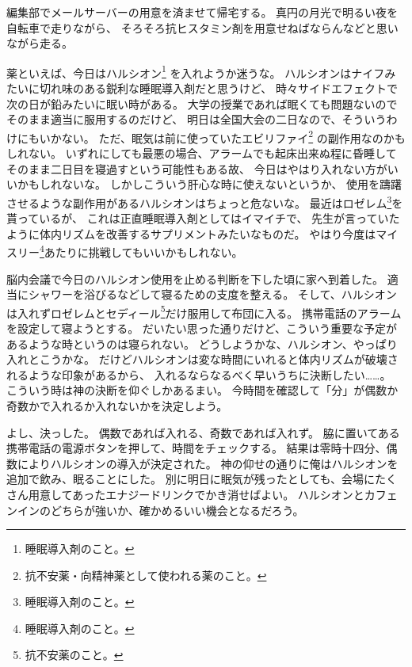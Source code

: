 編集部でメールサーバーの用意を済ませて帰宅する。
真円の月光で明るい夜を自転車で走りながら、
そろそろ抗ヒスタミン剤を用意せねばならんなどと思いながら走る。

薬といえば、今日はハルシオン\footnote{睡眠導入剤のこと。}%
を入れようか迷うな。
ハルシオンはナイフみたいに切れ味のある鋭利な睡眠導入剤だと思うけど、
時々サイドエフェクトで次の日が鉛みたいに眠い時がある。
大学の授業であれば眠くても問題ないのでそのまま適当に服用するのだけど、
明日は全国大会の二日なので、そういうわけにもいかない。
ただ、眠気は前に使っていたエビリファイ\footnote{抗不安薬・向精神薬として使われる薬のこと。}%
の副作用なのかもしれない。
いずれにしても最悪の場合、アラームでも起床出来ぬ程に昏睡してそのまま二日目を寝過すという可能性もある故、
今日はやはり入れない方がいいかもしれないな。
しかしこういう肝心な時に使えないというか、
使用を躊躇させるような副作用があるハルシオンはちょっと危ないな。
最近はロゼレム\footnote{睡眠導入剤のこと。}を貰っているが、
これは正直睡眠導入剤としてはイマイチで、
先生が言っていたように体内リズムを改善するサプリメントみたいなものだ。
やはり今度はマイスリー\footnote{睡眠導入剤のこと。}あたりに挑戦してもいいかもしれない。

脳内会議で今日のハルシオン使用を止める判断を下した頃に家へ到着した。
適当にシャワーを浴びるなどして寝るための支度を整える。
そして、ハルシオンは入れずロゼレムとセディール\footnote{抗不安薬のこと。}だけ服用して布団に入る。
携帯電話のアラームを設定して寝ようとする。
だいたい思った通りだけど、こういう重要な予定があるような時というのは寝られない。
どうしようかな、ハルシオン、やっぱり入れとこうかな。
だけどハルシオンは変な時間にいれると体内リズムが破壊されるような印象があるから、
入れるならなるべく早いうちに決断したい……。
こういう時は神の決断を仰ぐしかあるまい。
今時間を確認して「分」が偶数か奇数かで入れるか入れないかを決定しよう。

よし、決っした。
偶数であれば入れる、奇数であれば入れず。
脇に置いてある携帯電話の電源ボタンを押して、時間をチェックする。
結果は零時十四分、偶数によりハルシオンの導入が決定された。
神の仰せの通りに俺はハルシオンを追加で飲み、眠ることにした。
別に明日に眠気が残ったとしても、会場にたくさん用意してあったエナジードリンクでかき消せばよい。
ハルシオンとカフェンインのどちらが強いか、確かめるいい機会となるだろう。
